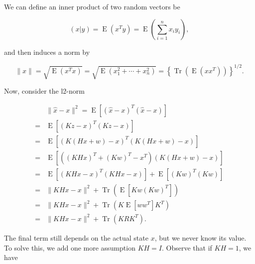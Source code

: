 \documentclass{article}
\begin{document}
            We can define an inner product of two random vectors be

            \begin{equation*}
                (x|y) = \operatorname{E}(x^{T} y) = \operatorname{E}\left(
                \sum_{i=1}^{n} x_{i} y_{i} \right),
            \end{equation*}

            and then induces a norm by

            \begin{equation*}
                 \| x \| = \sqrt{\operatorname{E}(x^{T}x)} =
                 \sqrt{\operatorname{E}(x_{1}^{2} + \cdots + x_{n}^{2})} = 
                     \left\{ \operatorname{Tr}\left( \operatorname{E}(x x^{T})
                     \right) \right\}^{1/2}.
            \end{equation*}

            Now, consider the l2-norm

            \begin{align*}
                 &\| \hat{x} - x \|^{2} = \operatorname{E}\left[ (\hat{x} - x)^{T} (\hat{x} - x) \right] \\
                =&\operatorname{E}\left[ \left( Kz - x \right)^{T} \left( Kz - x \right) \right] \\
                =&\operatorname{E}\left[ \left( K \left( Hx + w \right) - x \right)^{T} \left( K\left( Hx + w \right) - x \right) \right] \\
                =&\operatorname{E}\left[ \left( (KHx)^{T} + (Kw)^{T} - x^{T} \right) \left( K\left( Hx + w \right) - x \right) \right] \\
                =&\operatorname{E}\left[ \left( KHx - x \right)^{T} \left( KHx - x \right) \right] + \operatorname{E}\left[ \left( Kw \right)^{T} (Kw) \right] \\
                =&\|KHx - x\|^{2} + \operatorname{Tr}\left( \operatorname{E}\left[ Kw\left( Kw \right)^{T} \right] \right) \\
                =&\|KHx - x\|^{2} + \operatorname{Tr}\left( K \operatorname{E}[w w^{T}] K^{T} \right) \\
                =&\|KHx - x\|^{2} + \operatorname{Tr}\left( K R K^{T} \right).
            \end{align*}

            The final term still depends on the actual state $ x $, but we
            never know its value. To solve this, we add one more assumption $
            KH = I $. Observe that if $ KH = 1 $, we have
\end{document}
